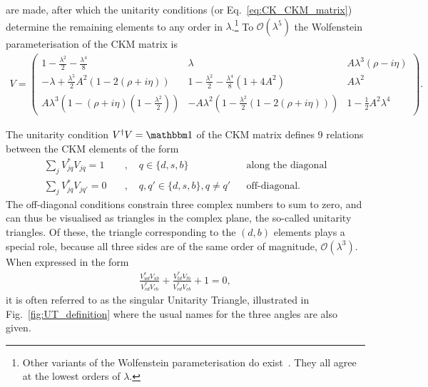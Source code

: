 are made, after which the unitarity conditions (or Eq.~\ref{eq:CK_CKM_matrix}) determine the remaining elements to any order in $\lambda$.\footnote{Other variants of the Wolfenstein parameterisation do exist~\cite{ahnWolfensteinParametrizationHigher2011}. They all agree at the lowest orders of $\lambda$.} 
To $\mathcal O (\lambda^5)$ the Wolfenstein parameterisation of the CKM matrix is~\cite{burasWaitingTopQuark1994,charlesCPViolationCKM2005}
% 
\begin{align}\label{eq:CKM_Wolf}
    V = \begin{pmatrix}
        1-\frac{\lambda^2}{2} -\frac{\lambda^4}{8}&
        \lambda &
        A\lambda^3(\rho - i \eta) \\
        -\lambda+\frac{\lambda^5}{2}A^2(1-2(\rho+i\eta)) &
        1 - \frac{\lambda^2}{2} - \frac{\lambda^4}{8}(1+4A^2) &
        A\lambda^2 \\
        A \lambda^3(1-(\rho + i\eta)(1 - \frac{\lambda^2}{2})) &
        -A\lambda^2 (1- \frac{\lambda^2}{2}(1-2(\rho+i\eta)))&
        1 - \frac{1}{2}A^2\lambda^4
    \end{pmatrix}.
\end{align}{}

The unitarity condition $V^\dagger V = \mathbbm 1$ of the CKM matrix defines 9 relations between the CKM elements of the form
\begin{subequations}
    \begin{align}
    \sum_j V^*_{jq}V_{jq} = 1\quad&,\quad q\in\{d, s, b\} & &\text{along the diagonal} \\
    \sum_j V^*_{jq}V_{jq'} = 0\quad&,\quad q, q'\in\{d, s, b\}, q\neq q' & &\text{off-diagonal}.
\end{align}
\end{subequations}
The off-diagonal conditions constrain three complex numbers to sum to zero, and can thus be visualised as triangles in the complex plane, the so-called unitarity triangles. Of these, the triangle corresponding to the $(d, b)$ elements plays a special role, because all three sides are of the same order of magnitude, $\mathcal O(\lambda^3)$. When expressed in the form
\begin{align}
    \frac{V^*_{ud}V_{ub}}{V^*_{cd}V_{cb}} +  \frac{V^*_{td}V_{tb}}{V^*_{cd}V_{cb}} +1 = 0,
\end{align}
it is often referred to as the singular Unitarity Triangle, illustrated in Fig.~\ref{fig:UT_definition} where the usual names for the three angles are also given.

